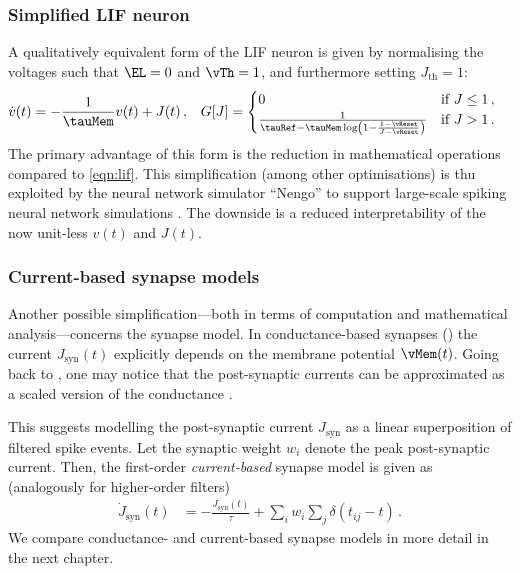 \subsubsection{Simplified LIF neuron}
A qualitatively equivalent form of the LIF neuron is given by normalising the voltages such that $\EL = 0$ and $\vTh = 1$, and furthermore setting $J_\mathrm{th} = 1$:
\begin{align}
	\dot v(t) &= -\frac{1}{\tauMem} v(t) + J(t) \,, &
	G[J] &= \begin{cases}
		0 & \text{if } J \leq 1 \,, \\
		\frac{1}{\tauRef - \tauMem \log\left(1 - \frac{1 - \vReset}{J-\vReset}\right)} & \text{if } J > 1 \,.
	\end{cases}
	\label{eqn:lif_simplified}
\end{align}
The primary advantage of this form is the reduction in mathematical operations compared to \cref{eqn:lif}.
This simplification (among other optimisations) is thu exploited by the neural network simulator \enquote{Nengo} to support large-scale spiking neural network simulations \citep{bekolay2014nengo}.
The downside is a reduced interpretability of the now unit-less $v(t)$ and $J(t)$.

\subsubsection{Current-based synapse models}
Another possible simplification---both in terms of computation and mathematical analysis---concerns the synapse model.
In conductance-based synapses () the current $J_\mathrm{syn}(t)$ explicitly depends on the membrane potential $\vMem(t)$.
Going back to , one may notice that the post-synaptic currents can be approximated as a scaled version of the conductance \citep[cf.][]{roth2009modeling}.

This suggests modelling the post-synaptic current $J_\mathrm{syn}$ as a linear superposition of filtered spike events.
Let the synaptic weight $w_i$ denote the peak post-synaptic current.
Then, the first-order \emph{current-based} synapse model is given as (analogously for higher-order filters)
\begin{align}
	\dot J_\mathrm{syn}(t) &= -\frac{J_\mathrm{syn}(t)}{\tau} + \sum\nolimits_{i}  w_i \sum\nolimits_{j} \delta(t_{ij} - t) \,.
	\label{eqn:low_pass_first_order_current}
\end{align}
We compare conductance- and current-based synapse models in more detail in the next chapter.

